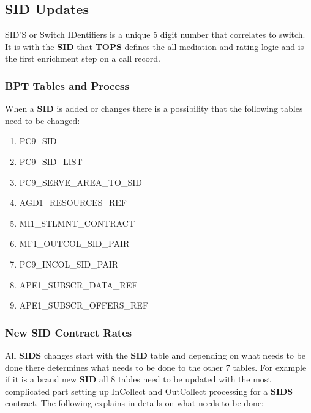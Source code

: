 \documentclass[12pt,twoside]{article}
\begin{document}
\subsection{SID Updates}
\label{sec-9-16}

   SID'S or Switch IDentifiers is a unique 5 digit number that correlates to switch. It is with the \textbf{SID} that \textbf{TOPS} defines the all mediation and rating logic and is the first enrichment step on a call record.
\subsubsection{BPT Tables and Process}
\label{sec-9-16-1}

   When a \textbf{SID} is added or changes there is a possibility that the following tables need to be changed:
\begin{enumerate}
\item PC9\_SID
\item PC9\_SID\_LIST
\item PC9\_SERVE\_AREA\_TO\_SID
\item AGD1\_RESOURCES\_REF
\item MI1\_STLMNT\_CONTRACT
\item MF1\_OUTCOL\_SID\_PAIR
\item PC9\_INCOL\_SID\_PAIR
\item APE1\_SUBSCR\_DATA\_REF
\item APE1\_SUBSCR\_OFFERS\_REF
\end{enumerate}
\subsubsection{New SID Contract Rates}
\label{sec-9-16-2}

   All \textbf{SIDS} changes start with the \textbf{SID} table and depending on what needs to be done there determines what needs to be done to the other 7 tables.
   For example if it is a brand new \textbf{SID} all 8 tables need to be updated with the most complicated part setting up InCollect and OutCollect processing for a \textbf{SIDS} contract. The following explains in details on what needs to be done:
\end{document}

